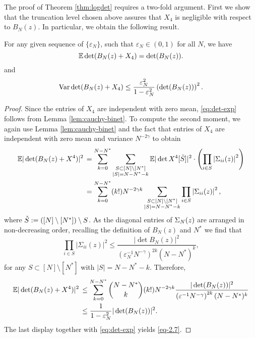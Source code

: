 \documentclass{amsart}
\numberwithin{equation}{section}
\def\corAB{}
\begin{document}
The proof of Theorem \ref{thm:logdet} requires a two-fold argument. First we show that the truncation level chosen above assures that $X_4$ is negligible with respect to $B_N(z)$. In particular, we obtain the following result.
\begin{lemma}\label{lem:det-B_N}
For any given sequence of $\{\varepsilon_N\}$, such that $\varepsilon_N \in (0,1)$ for all $N$, we have
\begin{equation}\label{eq:det-exp}
\mathbb E \det (B_N(z)+X_4)= \det(B_N(z)).
\end{equation}
and
  \begin{equation}
    \label{eq-2.7}
    \operatorname{Var} \det(B_N(z) + X_4) \leq \frac{\varepsilon_N^2}{1-\varepsilon_N^2}\left( \det(B_N(z))\right)^2.
  \end{equation}
  \label{lem:chebyshev}
\end{lemma}
\begin{proof}
  Since the entries of $X_4$ are independent with zero mean, \eqref{eq:det-exp}
  follows from \corAB{Lemma \ref{lem:cauchy-binet}}.
  To compute the second moment, we \corAB{again use Lemma \ref{lem:cauchy-binet}}
  and the fact that entries of $X_4$ are independent with zero mean and variance $N^{-2\gamma}$ to obtain
  \begin{align*}
    \mathbb{E}| \det(B_N(z) + X^4)|^2
  & \,  =  \sum_{k=0}^{N-N^*} \sum_{\substack{ S \subset [N]\setminus[N^*] \\ |S| = N-N^*-k}}
    \mathbb{E} |\det X^4[\check{S}]|^2 \cdot \left(
    \prod_{i \in S} \left|\Sigma_{ii}(z)\right|^2\right)\\
    & \, =
    \sum_{k=0}^{N-N^*}
    (k!)N^{-2\gamma k}
    \sum_{\substack{ S \subset [N]\setminus[N^*] \\ |S| = N-N^*-k}} \prod_{i \in S} \left|\Sigma_{ii}(z)\right|^2,
  \end{align*}
  \corAB{where $\check{S}:=([N]\setminus [N^*])\setminus S$}. As the diagonal entries of $\Sigma_N(z)$ are arranged in non-decreasing order, recalling the definition of $B_N(z)$ and $N^*$ we find that
\[
\prod_{i \in S}| \Sigma_{ii}(z)|^2 \le \frac{|\det B_N(z)|^2}{\left( \varepsilon_N^{-1} N^{-\gamma}\right)^{2k} (N-N^*)^k},
\]
for any $S\subset [N]\setminus[N^*]$ with $|S| = N-N^*-k$. Therefore,
  \begin{align*}
    \mathbb{E} |\det(B_N(z) + X^4)|^2
   & \,  \leq
    \sum_{k=0}^{N-N^*}
    \binom{N-N^*}{k}(k!)N^{-2\gamma k}
    \frac{| \det(B_N(z) )|^2}{\left( \varepsilon^{-1} N^{-\gamma}\right)^{2k} (N-N^*)^k}\\
  & \, \leq \frac{1}{1-\varepsilon_N^2}   | \det(B_N(z) )|^2.
  \end{align*}
The last display together with
\eqref{eq:det-exp}
yields
\eqref{eq-2.7}.
\end{proof}
\end{document}
